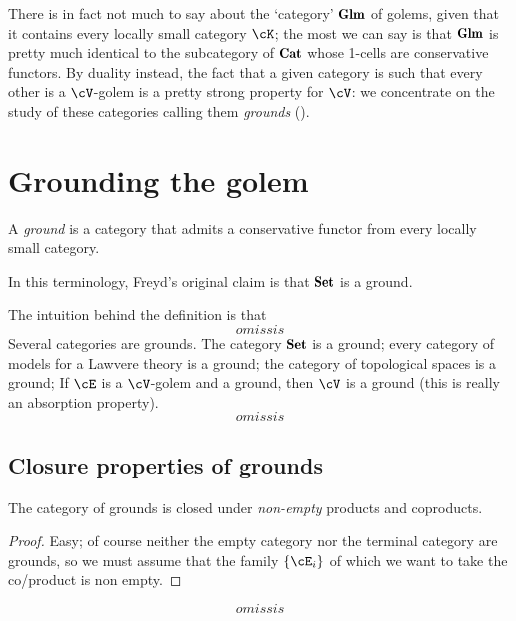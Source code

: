 \documentclass[a4paper,10pt,draft]{amsart}
\begin{document}
There is in fact not much to say about the `category' $\cate{Glm}$ of golems, given that it contains every locally small category $\cK$; the most we can say is that $\cate{Glm}$ is pretty much identical to the subcategory of $\cate{Cat}$ whose 1-cells are conservative functors. By duality instead, the fact that a given category is such that every other is a $\cV$-golem is a pretty strong property for $\cV$: we concentrate on the study of these categories calling them \emph{grounds} (\grounds).
\section{Grounding the golem}
\begin{definition}
A \emph{ground} is a category that admits a conservative functor from every locally small category.
\end{definition}
\begin{remark}
In this terminology, Freyd's original claim is that $\Set$ is a ground.
\end{remark}
\begin{remark}
The intuition behind the definition is that 
\[
omissis
\]
Several categories are grounds. The category $\Set$ is a ground; every category of models for a Lawvere theory is a ground; the category of topological spaces is a ground; If $\cE$ is a $\cV$-golem and a ground, then $\cV$ is a ground (this is really an absorption property).
\[
omissis
\]
\end{remark}
\subsection{Closure properties of grounds}
\begin{proposition}
The category of grounds is closed under \emph{non-empty} products and coproducts.
\end{proposition}
\begin{proof}
Easy; of course neither the empty category nor the terminal category are grounds, so we must assume that the family $\{\cE_i\}$ of which we want to take the co/product is non empty.
\end{proof}
\[
omissis
\]
\end{document}
